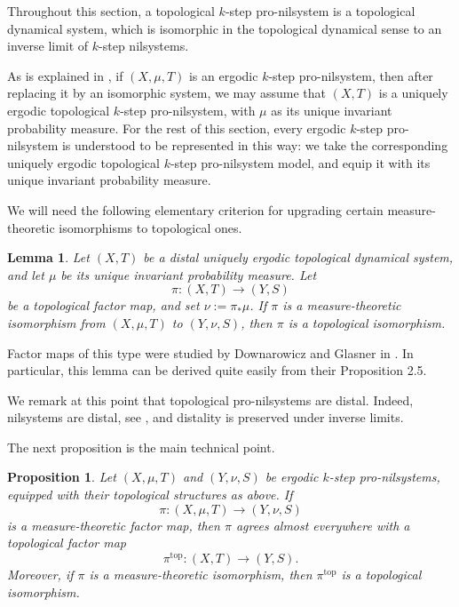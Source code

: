 \documentclass[12pt]{amsart}
\theoremstyle{plain}
\newtheorem{proposition}[theorem]{Proposition}
\newtheorem{lemma}[theorem]{Lemma}
\theoremstyle{definition}
\begin{document}
Throughout this section, a topological $k$-step pro-nilsystem is a topological dynamical system, which is isomorphic in the topological dynamical sense to an inverse limit of $k$-step nilsystems. 

As is explained in \cite[Chapter 13, Section 3]{hk-book}, if $(X, \mu, T)$ is an ergodic $k$-step pro-nilsystem, then after replacing it by an isomorphic system, we may assume that $(X, T)$ is a uniquely ergodic topological $k$-step pro-nilsystem, with $\mu$ as its unique invariant probability measure. 
For the rest of this section, every ergodic $k$-step pro-nilsystem is understood to be represented in this way: we take the corresponding uniquely ergodic topological $k$-step pro-nilsystem model, and equip it with its unique invariant probability measure.

We will need the following elementary criterion for upgrading certain measure-theoretic isomorphisms to topological ones. 

\begin{lemma}\label{lem:upgrade_mble_to_top_isom}
    Let $(X, T)$ be a distal uniquely ergodic topological dynamical system, and let $\mu$ be its unique invariant probability measure. 
    Let 
    \[
    \pi \colon (X, T) \to (Y, S)
    \]
    be a topological factor map, and set $\nu := \pi_* \mu$.
    If $\pi$ is a measure-theoretic isomorphism from $(X, \mu, T)$ to $(Y, \nu, S)$, then $\pi$ is a topological isomorphism.
\end{lemma}

Factor maps of this type were studied by Downarowicz and Glasner in \cite{downarowicz2016isomorphic}.
In particular, this lemma can be derived quite easily from their Proposition 2.5.

We remark at this point that topological pro-nilsystems are distal. 
Indeed, nilsystems are distal, see \cite[Chapter 11, Theorem 2]{hk-book}, and distality is preserved under inverse limits.

The next proposition is the main technical point. 

\begin{proposition}\label{prop:factors_between_pronilsystems}
    Let $(X, \mu, T)$ and $(Y, \nu, S)$ be ergodic $k$-step pro-nilsystems, equipped with their topological structures as above. 
    If 
    \[
    \pi \colon (X, \mu, T) \to (Y, \nu, S)
    \]
    is a measure-theoretic factor map, then $\pi$ agrees almost everywhere with a topological factor map 
    \[
    \pi^{\mathrm{top}} \colon (X, T) \to (Y, S). 
    \]
    Moreover, if $\pi$ is a measure-theoretic isomorphism, then $\pi^{\mathrm{top}}$ is a topological isomorphism.
\end{proposition}
\end{document}
